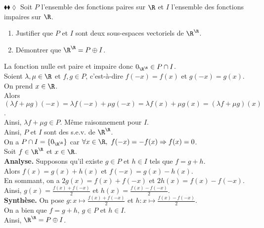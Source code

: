 \documentclass[11pt]{article}
\begin{document}
\begin{exercice}{$\blacklozenge\blacklozenge\lozenge$}{}
    Soit $P$ l'ensemble des fonctions paires sur $\R$ et $I$ l'ensemble des fonctions impaires sur $\R$.
    \begin{enumerate}
        \item Justifier que $P$ et $I$ sont deux sous-espaces vectoriels de $\R^\R$.
        \item Démontrer que $\R^\R = P \oplus I$.
    \end{enumerate}
    \tcblower
     La fonction nulle est paire et impaire donc $0_{\R^\R} \in P \cap I$.\\
    Soient $\lambda, \mu \in \R$ et $f, g \in P$, c'est-à-dire $f(-x) = f(x)$ et $g(-x) = g(x)$. On prend $x\in\R$.\\
    Alors $(\lambda f + \mu g)(-x) = \lambda f(-x) + \mu g(-x) = \lambda f(x) + \mu g(x) = (\lambda f + \mu g)(x)$.\\
    Ainsi, $\lambda f + \mu g \in P$. Même raisonnement pour $I$.\\
    Ainsi, $P$ et $I$ sont des s.e.v. de $\R^\R$.\\[0.3cm]
     On a $P \cap I = \{0_{\R^\R}\}$ car $\forall x \in \R, ~  f(-x) = -f(x) \Rightarrow f(x) = 0$.\\
    Soit $f \in \R^\R$ et $x\in\R$. \\
    \textbf{Analyse.} Supposons qu'il existe $g \in P$ et $h \in I$ tels que $f = g + h$.\\
    Alors $f(x) = g(x) + h(x)$ et $f(-x)=g(x)-h(x)$.\\
    En sommant, on a $2g(x) = f(x) + f(-x)$ et $2h(x) = f(x) - f(-x)$.\\
    Ainsi, $g(x) = \frac{f(x) + f(-x)}{2}$ et $h(x) = \frac{f(x) - f(-x)}{2}$.\\[0.1cm]
    \textbf{Synthèse.} On pose $g : x \mapsto \frac{f(x) + f(-x)}{2}$ et $h : x \mapsto \frac{f(x) - f(-x)}{2}$.\\
    On a bien que $f = g + h$, $g \in P$ et $h \in I$.\\
    Ainsi, $\R^\R = P \oplus I$.
\end{exercice}
\end{document}
